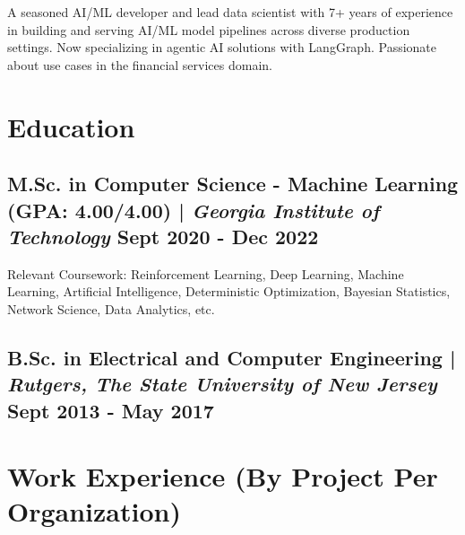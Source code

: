 \documentclass[letter,10pt]{article}
\begin{document}
\noindent
A seasoned AI/ML developer and lead data scientist with 7+ years of experience in building and serving AI/ML model pipelines across diverse production settings. Now specializing in agentic AI solutions with LangGraph. Passionate about use cases in the financial services domain.

\section{Education}
\subsection{{M.Sc. in Computer Science - Machine Learning (GPA: 4.00/4.00)} | \textit{Georgia Institute of Technology} \hfill Sept 2020 - Dec 2022}
\begin{zitemize}
\item \normalfont Relevant Coursework: Reinforcement Learning, Deep Learning, Machine Learning, Artificial Intelligence, Deterministic Optimization, Bayesian Statistics, Network Science, Data Analytics, etc.
\end{zitemize}

\subsection{{B.Sc. in Electrical and Computer Engineering} | \textit{Rutgers, The State University of New Jersey} \hfill Sept 2013 - May 2017}
\vspace{4mm} %

\section{Work Experience (By Project Per Organization)}
\end{document}
